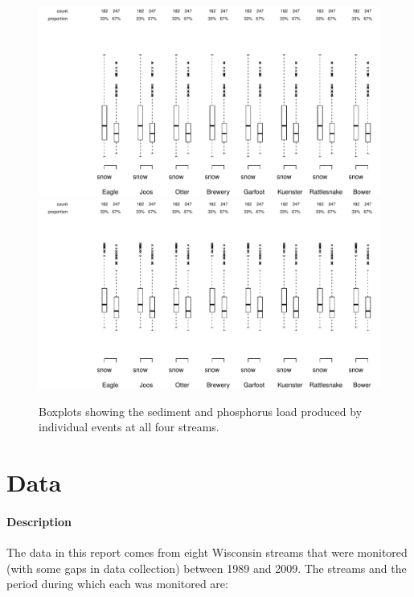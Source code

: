 \documentclass[10pt]{article}
\begin{document}
\begin{figure}[h]
    \begin{center}
\includegraphics{loadings-boxplot_stot}
    \vspace{15mm}
\includegraphics{loadings-boxplot_ptot}
    \caption{Boxplots showing the sediment and phosphorus load produced by individual events at all four streams.\label{boxplots}}
    \end{center}
\end{figure}














\section{Data}

\paragraph{Description}
The data in this report comes from eight Wisconsin streams that were monitored (with some gaps in data collection) between 1989 and 2009. The streams and the period during which each was monitored are:
\end{document}
